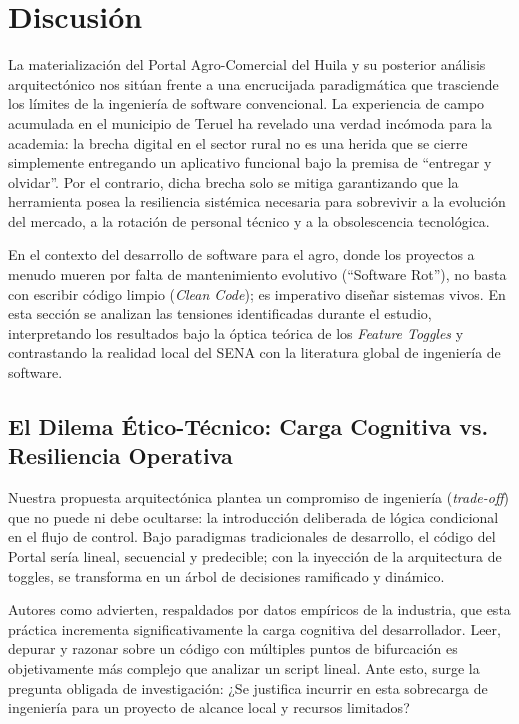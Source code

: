 ﻿\section{Discusión}

La materialización del Portal Agro-Comercial del Huila y su posterior análisis arquitectónico nos sitúan frente a una encrucijada paradigmática que trasciende los límites de la ingeniería de software convencional. La experiencia de campo acumulada en el municipio de Teruel ha revelado una verdad incómoda para la academia: la brecha digital en el sector rural no es una herida que se cierre simplemente entregando un aplicativo funcional bajo la premisa de ``entregar y olvidar''. Por el contrario, dicha brecha solo se mitiga garantizando que la herramienta posea la resiliencia sistémica necesaria para sobrevivir a la evolución del mercado, a la rotación de personal técnico y a la obsolescencia tecnológica.

En el contexto del desarrollo de software para el agro, donde los proyectos a menudo mueren por falta de mantenimiento evolutivo (``Software Rot''), no basta con escribir código limpio (\textit{Clean Code}); es imperativo diseñar sistemas vivos. En esta sección se analizan las tensiones identificadas durante el estudio, interpretando los resultados bajo la óptica teórica de los \textit{Feature Toggles} y contrastando la realidad local del SENA con la literatura global de ingeniería de software.

\subsection{El Dilema Ético-Técnico: Carga Cognitiva vs. Resiliencia Operativa}

Nuestra propuesta arquitectónica plantea un compromiso de ingeniería (\textit{trade-off}) que no puede ni debe ocultarse: la introducción deliberada de lógica condicional en el flujo de control. Bajo paradigmas tradicionales de desarrollo, el código del Portal sería lineal, secuencial y predecible; con la inyección de la arquitectura de toggles, se transforma en un árbol de decisiones ramificado y dinámico.

Autores como \cite{sharma2024complexity} advierten, respaldados por datos empíricos de la industria, que esta práctica incrementa significativamente la carga cognitiva del desarrollador. Leer, depurar y razonar sobre un código con múltiples puntos de bifurcación es objetivamente más complejo que analizar un script lineal. Ante esto, surge la pregunta obligada de investigación: ¿Se justifica incurrir en esta sobrecarga de ingeniería para un proyecto de alcance local y recursos limitados?

